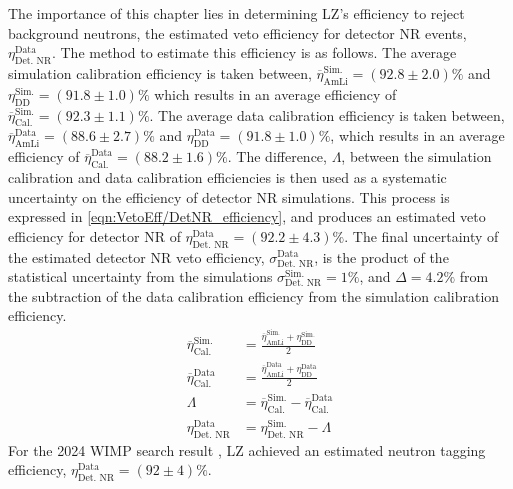 The importance of this chapter lies in determining LZ's efficiency to reject background neutrons, the estimated veto efficiency for detector NR events, $\eta_{\text{Det. NR}}^{\text{Data}}$. The method to estimate this efficiency is as follows. 
The average simulation calibration efficiency is taken between, $\overline{\eta}_{\text{AmLi}}^{\text{Sim.}}=(92.8\pm2.0)\%$ and $\eta_{\text{DD}}^{\text{Sim.}}=(91.8\pm1.0)\%$ which results in an average efficiency of $\overline{\eta}_{\text{Cal.}}^{\text{Sim.}}=(92.3\pm1.1)\%$.
The average data calibration efficiency is taken between, $\overline{\eta}_{\text{AmLi}}^{\text{Data}}=(88.6\pm2.7)\%$ and $\eta_{\text{DD}}^{\text{Data}}=(91.8\pm1.0)\%$, which results in an average efficiency of $\overline{\eta}_{\text{Cal.}}^{\text{Data}}=(88.2\pm1.6)\%$.
The difference, $\Lambda$, between the simulation calibration and data calibration efficiencies is then used as a systematic uncertainty on the efficiency of detector NR simulations.
This process is expressed in \autoref{eqn:VetoEff/DetNR_efficiency}, and produces an estimated veto efficiency for detector NR of $\eta_{\text{Det. NR}}^\text{Data}=(92.2\pm4.3)\%$.
The final uncertainty of the estimated detector NR veto efficiency, $\sigma^\text{Data}_\text{Det. NR}$, is the product of the statistical uncertainty from the simulations $\sigma^\text{Sim.}_\text{Det. NR}=1\%$, and $\Delta=4.2\%$ from the subtraction of the data calibration efficiency from the simulation calibration efficiency.
\begin{equation}
    \label{eqn:VetoEff/DetNR_efficiency}
    \begin{split}
    	\overline{\eta}_{\text{Cal.}}^{\text{Sim.}} & = \frac{\overline{\eta}_{\text{AmLi}}^{\text{Sim.}}+\eta_{\text{DD}}^{\text{Sim.}}}{2}\\
    	\overline{\eta}_{\text{Cal.}}^{\text{Data}} & = \frac{\overline{\eta}_{\text{AmLi}}^{\text{Data}}+\eta_{\text{DD}}^{\text{Data}}}{2} \\
    	\Lambda &= \overline{\eta}_{\text{Cal.}}^{\text{Sim.}} - \overline{\eta}_{\text{Cal.}}^{\text{Data}}\\
    	\eta_\text{Det. NR}^\text{Data}   & = \eta_\text{Det. NR}^\text{Sim.} - \Lambda
    \end{split}
\end{equation}
For the 2024 WIMP search result \cite{LZCollaboration:2024lux}, LZ achieved an estimated neutron tagging efficiency, $\eta_\text{Det. NR}^\text{Data}=(92\pm4)\%$.

